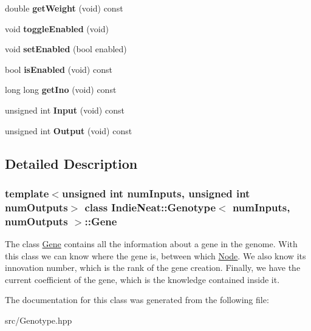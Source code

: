 \begin{DoxyCompactItemize}
double {\bfseries get\+Weight} (void) const
\item 
\mbox{\label{class_indie_neat_1_1_genotype_1_1_gene_ae6c7def704522367a17e24f0b5d34a2d}} 
void {\bfseries toggle\+Enabled} (void)
\item 
\mbox{\label{class_indie_neat_1_1_genotype_1_1_gene_ace348052be7366d9617f300e04432f6a}} 
void {\bfseries set\+Enabled} (bool enabled)
\item 
\mbox{\label{class_indie_neat_1_1_genotype_1_1_gene_a0500752fe9bccddb2e75b8624bb970fb}} 
bool {\bfseries is\+Enabled} (void) const
\item 
\mbox{\label{class_indie_neat_1_1_genotype_1_1_gene_a1bc8e6ee64605d55297b4e2be10750bd}} 
long long {\bfseries get\+Ino} (void) const
\item 
\mbox{\label{class_indie_neat_1_1_genotype_1_1_gene_af2ada5b6314d0af72535a1770e4d20f1}} 
unsigned int {\bfseries Input} (void) const
\item 
\mbox{\label{class_indie_neat_1_1_genotype_1_1_gene_a8533d25d547d637ca4ca78cba2c90aed}} 
unsigned int {\bfseries Output} (void) const
\end{DoxyCompactItemize}


\subsection{Detailed Description}
\subsubsection*{template$<$unsigned int num\+Inputs, unsigned int num\+Outputs$>$\newline
class Indie\+Neat\+::\+Genotype$<$ num\+Inputs, num\+Outputs $>$\+::\+Gene}

The class \hyperlink{class_indie_neat_1_1_genotype_1_1_gene}{Gene} contains all the information about a gene in the genome. With this class we can know where the gene is, between which \hyperlink{class_indie_neat_1_1_genotype_1_1_node}{Node}. We also know its innovation number, which is the rank of the gene creation. Finally, we have the current coefficient of the gene, which is the knowledge contained inside it. 

The documentation for this class was generated from the following file\+:\begin{DoxyCompactItemize}
\item 
src/Genotype.\+hpp\end{DoxyCompactItemize}

